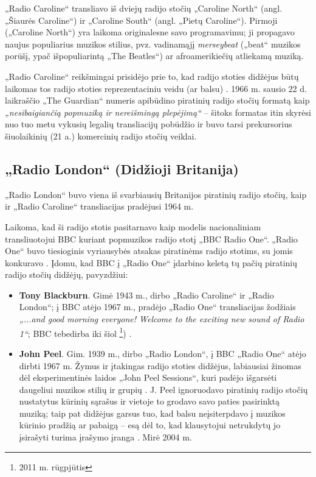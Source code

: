 \documentclass[kursinis-darbas]{vukf}
\begin{document}
„Radio Caroline“ transliavo iš dviejų radijo stočių „Caroline North“ (angl. „Šiaurės Caroline“) ir „Caroline South“ (angl. „Pietų Caroline“). Pirmoji („Caroline North“) yra laikoma originalesne savo programavimu; ji propagavo naujus populiarius muzikos stilius, pvz. vadinamąjį \emph{merseybeat} („beat“ muzikos porūšį, ypač išpopuliarintą „The Beatles“) ar afroamerikiečių atliekamą muziką.

„Radio Caroline“ reikšmingai prisidėjo prie to, kad radijo stoties didžėjus būtų laikomas tos radijo stoties reprezentaciniu veidu (ar balsu) \cite[p.~238]{chs_encyclopedia_of_radio} \cite[p.~447]{js_continuum_encyclopedia}. 1966 m. sausio 22 d. laikraščio „The Guardian“ numeris apibūdino piratinių radijo stočių formatą kaip \emph{„nesibaigiančią popmuziką ir nereišmingą plepėjimą“} \cite[p.~447]{js_continuum_encyclopedia} – šitoks formatas itin skyrėsi nuo tuo metu vykusių legalių transliacijų pobūdžio ir buvo tarsi prekursorius šiuolaikinių (21 a.) komercinių radijo stočių veiklai.


\subsection{„Radio London“ (Didžioji Britanija)}

„Radio London“ buvo viena iš svarbiausių Britanijos piratinių radijo stočių, kaip ir „Radio Caroline“ transliacijas pradėjusi 1964 m.

Laikoma, kad ši radijo stotis pasitarnavo kaip modelis nacionaliniam transliuotojui \gls{BBC} kuriant popmuzikos radijo stotį „BBC Radio One“. „Radio One“ buvo tiesioginis vyriausybės atsakas piratinėms radijo stotims, su jomis konkuravo \cite[p.~238]{chs_encyclopedia_of_radio} \cite[p.~448]{js_continuum_encyclopedia}. Įdomu, kad \gls{BBC} į „Radio One“ įdarbino keletą tų pačių piratinių radijo stočių didžėjų, pavyzdžiui:

\begin{itemize}
	\item \textbf{Tony Blackburn}. Gimė 1943 m., dirbo „Radio Caroline“ ir „Radio London“; į \gls{BBC} atėjo 1967 m., pradėjo „Radio One“ transliacijas žodžiais \emph{„...and good morning everyone! Welcome to the exciting new sound of Radio 1“}; \gls{BBC} tebedirba iki šiol \footnote{2011 m. rūgpjūtis}) \cite{guardian_radio_1_launches}.
	\item \textbf{John Peel}. Gim. 1939 m., dirbo „Radio London“, į \gls{BBC} „Radio One“ atėjo dirbti 1967 m. Žymus ir įtakingas radijo stoties didžėjus, labiausiai žinomas dėl eksperimentinės laidos „John Peel Sessions“, kuri padėjo išgarsėti daugeliui muzikos stilių ir grupių \cite{bbc_john_peel_sessions}. J. Peel ignoruodavo piratinių radijo stočių nustatytus kūrinių sąrašus ir vietoje to grodavo savo paties pasirinktą muziką; taip pat didžėjus garsus tuo, kad balsu neįsiterpdavo į muzikos kūrinio pradžią ar pabaigą – esą dėl to, kad klausytojui netrukdytų jo įsirašyti turima įrašymo įranga \cite[p.~139]{hc_key_concepts_in_radio_studies}. Mirė 2004 m.
\end{itemize}
\end{document}
